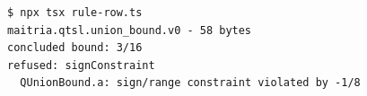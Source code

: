 \begin{Verbatim}[fontsize=\small,frame=leftline,rulecolor=\color{accentmid},framesep=3mm,xleftmargin=3mm]
$ npx tsx rule-row.ts
maitria.qtsl.union_bound.v0 - 58 bytes
concluded bound: 3/16
refused: signConstraint
  QUnionBound.a: sign/range constraint violated by -1/8
\end{Verbatim}
